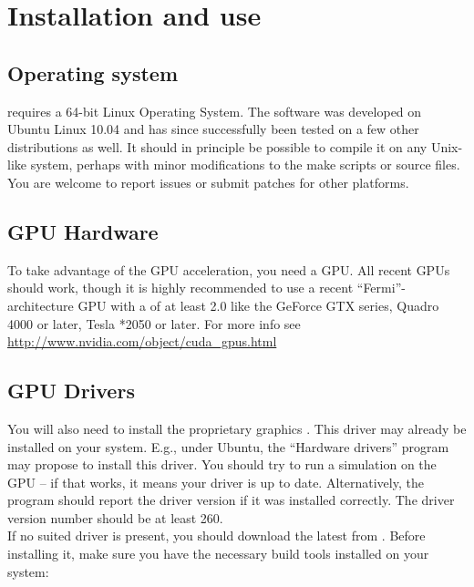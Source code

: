 \section{Installation and use}


\subsection{Operating system}

\mumax requires a 64-bit Linux Operating System. The software was developed on Ubuntu Linux 10.04 and has since successfully been tested on a few other distributions as well. It should in principle be possible to compile it on any Unix-like system, perhaps with minor modifications to the make scripts or source files. You are welcome to report issues or submit patches for other platforms.

\subsection{GPU Hardware}

To take advantage of the GPU acceleration, you need a  \nvidia GPU. All recent \nvidia GPUs should work, though it is highly recommended to use a recent ``Fermi''-architecture GPU with a  of at least 2.0 like the GeForce GTX series, Quadro 4000 or later, Tesla *2050 or later. For more info see \url{http://www.nvidia.com/object/cuda_gpus.html}

\subsection{GPU Drivers}

You will also need to install the proprietary \nvidia graphics . This driver may already be installed on your system. E.g., under Ubuntu, the ``Hardware drivers'' program may propose to install this driver. You should try to run a simulation on the GPU -- if that works, it means your driver is up to date. Alternatively, the program  should report the driver version if it was installed correctly. The driver version number should be at least 260.\\


If no suited driver is present, you should download the latest  from \nvidia. Before installing it, make sure you have the necessary build tools installed on your system:


